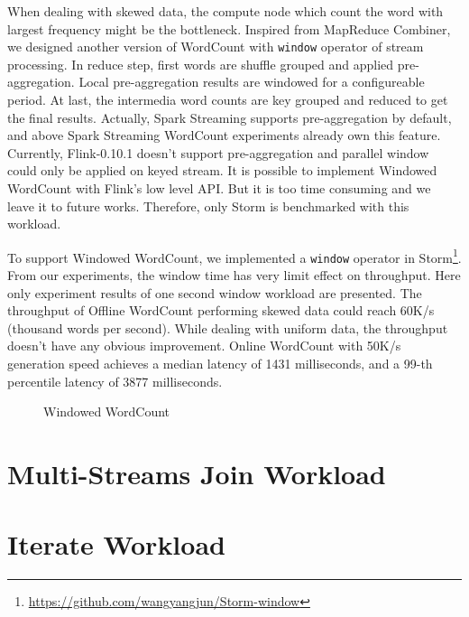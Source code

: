 When dealing with skewed data, the compute node which count the word with largest frequency might be the bottleneck. Inspired from MapReduce Combiner, we designed another version of WordCount with \texttt{window} operator of stream processing. In reduce step, first words are shuffle grouped and applied pre-aggregation. Local pre-aggregation results are windowed for a configureable period. At last, the intermedia word counts are key grouped and reduced to get the final results. Actually, Spark Streaming supports pre-aggregation by default, and above Spark Streaming WordCount experiments already own this feature. Currently, Flink-0.10.1 doesn't support pre-aggregation and parallel window could only be applied on keyed stream. It is possible to implement Windowed WordCount with Flink's low level API. But it is too time consuming and we leave it to future works. Therefore, only Storm is benchmarked with this workload.

To support Windowed WordCount, we implemented a \texttt{window} operator in Storm\footnote{\url{https://github.com/wangyangjun/Storm-window}}. From our experiments, the window time has very limit effect on throughput. Here only experiment results of one second window workload are presented. The throughput of Offline WordCount performing skewed data could reach 60K/s (thousand words per second). While dealing with uniform data, the throughput doesn't have any obvious improvement. Online WordCount with 50K/s generation speed achieves a median latency of 1431 milliseconds, and a 99-th percentile latency of 3877 milliseconds.

\begin{figure}
  \begin{center}
   \caption{Windowed WordCount}
   \label{fig:windowed_wordcount}
  \end{center}
\end{figure}



\section{Multi-Streams Join Workload}

\section{Iterate Workload}


\clearpage